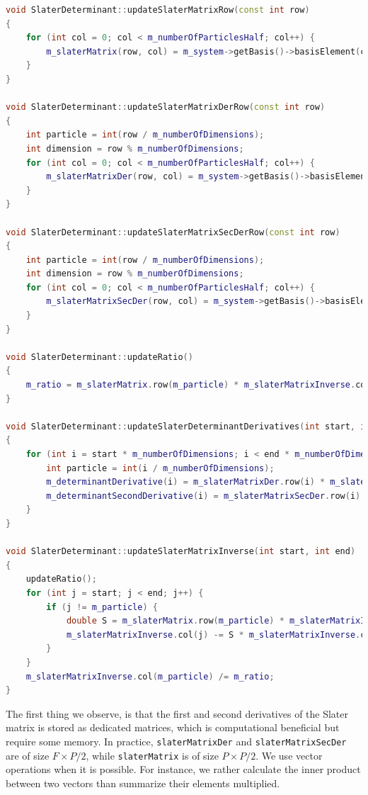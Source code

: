 \begin{lstlisting}[language=C++]
void SlaterDeterminant::updateSlaterMatrixRow(const int row)
{
	for (int col = 0; col < m_numberOfParticlesHalf; col++) {
		m_slaterMatrix(row, col) = m_system->getBasis()->basisElement(col, m_positionBlock.col(row));
	}
}

void SlaterDeterminant::updateSlaterMatrixDerRow(const int row)
{
	int particle = int(row / m_numberOfDimensions);
	int dimension = row % m_numberOfDimensions;
	for (int col = 0; col < m_numberOfParticlesHalf; col++) {
		m_slaterMatrixDer(row, col) = m_system->getBasis()->basisElementDer(col, dimension, m_positionBlock.col(particle));
	}
}

void SlaterDeterminant::updateSlaterMatrixSecDerRow(const int row)
{
	int particle = int(row / m_numberOfDimensions);
	int dimension = row % m_numberOfDimensions;
	for (int col = 0; col < m_numberOfParticlesHalf; col++) {
		m_slaterMatrixSecDer(row, col) = m_system->getBasis()->basisElementSecDer(col, dimension, m_positionBlock.col(particle));
	}
}

void SlaterDeterminant::updateRatio()
{
	m_ratio = m_slaterMatrix.row(m_particle) * m_slaterMatrixInverse.col(m_particle);
}

void SlaterDeterminant::updateSlaterDeterminantDerivatives(int start, int end)
{
	for (int i = start * m_numberOfDimensions; i < end * m_numberOfDimensions; i++) {
		int particle = int(i / m_numberOfDimensions);
		m_determinantDerivative(i) = m_slaterMatrixDer.row(i) * m_slaterMatrixInverse.col(particle);
		m_determinantSecondDerivative(i) = m_slaterMatrixSecDer.row(i) * m_slaterMatrixInverse.col(particle);
	}
}

void SlaterDeterminant::updateSlaterMatrixInverse(int start, int end)
{
	updateRatio();
	for (int j = start; j < end; j++) {
		if (j != m_particle) {
			double S = m_slaterMatrix.row(m_particle) * m_slaterMatrixInverse.col(j);
			m_slaterMatrixInverse.col(j) -= S * m_slaterMatrixInverse.col(m_particle) / m_ratio;
		}
	}
	m_slaterMatrixInverse.col(m_particle) /= m_ratio;
}
\end{lstlisting}

The first thing we observe, is that the first and second derivatives of the Slater matrix is stored as dedicated matrices, which is computational beneficial but require some memory. In practice, \lstinline{slaterMatrixDer} and \lstinline{slaterMatrixSecDer} are of size $F\times P/2$, while \lstinline{slaterMatrix} is of size $P\times P/2$. We use vector operations when it is possible. For instance, we rather calculate the inner product between two vectors than summarize their elements multiplied. 

